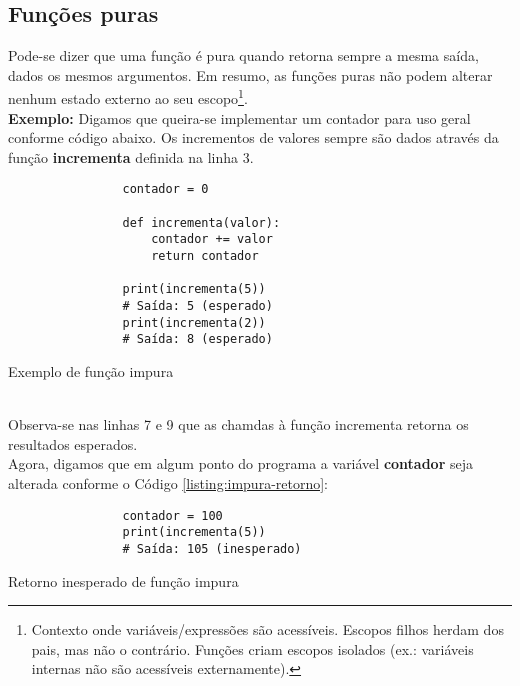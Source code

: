 \documentclass[date,twocolumn,a4paper]{ppgem}
\begin{document}
    \subsection{Funções puras}
        Pode-se dizer que uma função é pura quando retorna sempre a mesma saída, dados os mesmos argumentos\cite{queiroz_func_prog}. Em resumo, as funções
        puras não podem alterar nenhum estado externo ao seu escopo\footnote{Contexto onde variáveis/expressões são acessíveis. Escopos filhos herdam dos pais, mas não o contrário. Funções criam escopos isolados (ex.: variáveis internas não são acessíveis externamente)\cite{mdn_escopo}.}.\\
        \textbf{Exemplo:}
        Digamos que queira-se implementar um contador para uso geral conforme código abaixo. Os incrementos de valores sempre são dados através da função
        \textbf{incrementa} definida na linha 3.
        \begin{listing}[!ht]
            \begin{verbatim}
                contador = 0

                def incrementa(valor):
                    contador += valor
                    return contador

                print(incrementa(5))
                # Saída: 5 (esperado)
                print(incrementa(2))
                # Saída: 8 (esperado)
            \end{verbatim}
            \caption{Exemplo de função impura}
            \label{listing:impura}
        \end{listing}
        \\Observa-se nas linhas 7 e 9 que as chamdas à função incrementa retorna os resultados esperados.\\
        Agora, digamos que em algum ponto do programa a variável \textbf{contador} seja alterada conforme o
        Código \ref{listing:impura-retorno}:

        \begin{listing}[!ht]
            \begin{verbatim}
                contador = 100
                print(incrementa(5))
                # Saída: 105 (inesperado)
            \end{verbatim}
            \caption{Retorno inesperado de função impura}
            \label{listing:impura-retorno}
        \end{listing}\pagebreak
\end{document}
